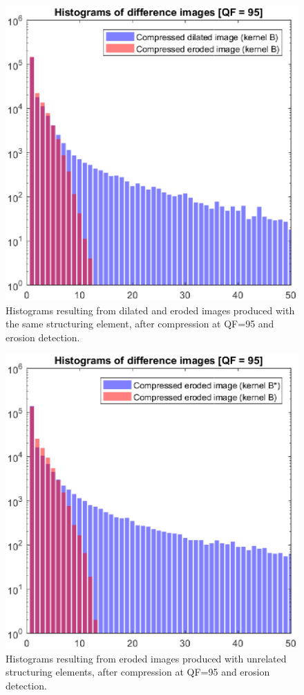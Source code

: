 \documentclass[review]{elsarticle}
\begin{document}
\begin{figure}[t!]
	\centering
	\includegraphics[scale=0.55]{hist_dil_ero_same.eps}
	\caption{Histograms resulting from dilated and eroded images produced with the same structuring element, after compression at QF=95 and erosion detection.}
	\label{fig:hist_dil_ero_same}
\end{figure}

\begin{figure}[t!]
	\centering
	\includegraphics[scale=0.55]{hist_ero_ero_diff.eps}
	\caption{Histograms resulting from eroded images produced with unrelated structuring elements, after compression at QF=95 and erosion detection.}
	\label{fig:hist_ero_ero_diff}
\end{figure}
\end{document}
